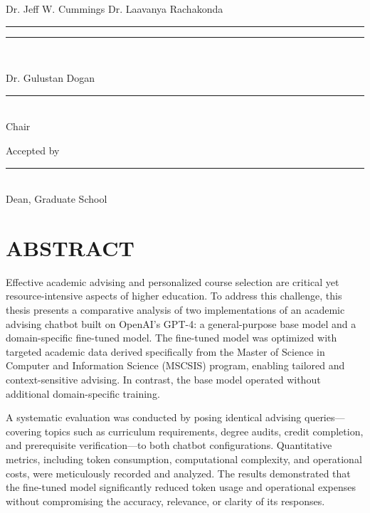 \documentclass[12pt,oneside,openany]{report}
\begin{document}
\begin{singlespace}
\begin{center}
    Dr. Jeff W. Cummings \hspace{2in} Dr. Laavanya Rachakonda
\end{center}
\vspace{-0.23in}
\rule{2.5in}{.01in} \hspace{1.65in} \rule{2.5in}{.01in}\\




\begin{center}
    Dr. Gulustan Dogan\\[-0.5em]   %
    \rule{2.5in}{0.01in}\\[0.5em]
    Chair

    \vspace{2em}  %

    Accepted by\\[0.5em]
    \rule{2.5in}{0.01in}\\[0.5em]
    Dean, Graduate School
\end{center}
\end{singlespace}

\newpage
\doublespacing
\chapter*{ABSTRACT}
\vspace{2ex}

Effective academic advising and personalized course selection are critical yet resource-intensive aspects of higher education. To address this challenge, this thesis presents a comparative analysis of two implementations of an academic advising chatbot built on OpenAI’s GPT-4: a general-purpose base model and a domain-specific fine-tuned model. The fine-tuned model was optimized with targeted academic data derived specifically from the Master of Science in Computer and Information Science (MSCSIS) program, enabling tailored and context-sensitive advising. In contrast, the base model operated without additional domain-specific training.

A systematic evaluation was conducted by posing identical advising queries—covering topics such as curriculum requirements, degree audits, credit completion, and prerequisite verification—to both chatbot configurations. Quantitative metrics, including token consumption, computational complexity, and operational costs, were meticulously recorded and analyzed. The results demonstrated that the fine-tuned model significantly reduced token usage and operational expenses without compromising the accuracy, relevance, or clarity of its responses.
\end{document}
